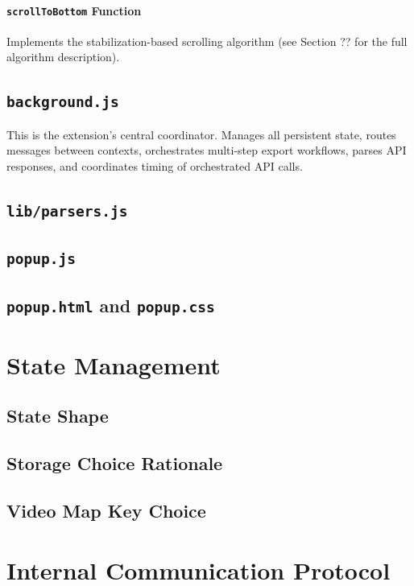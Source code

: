 \paragraph{\textbf{\texttt{scrollToBottom} Function}}

Implements the stabilization-based scrolling algorithm (see Section ?? for the full algorithm description).

\subsection{\texttt{background.js}}

This is the extension's central coordinator. Manages all persistent state, routes messages between contexts, orchestrates multi-step export workflows, parses API responses, and coordinates timing of orchestrated API calls.

\subsection{\texttt{lib/parsers.js}}

\subsection{\texttt{popup.js}}

\subsection{\texttt{popup.html} and \texttt{popup.css}}


\section{State Management}

\subsection{State Shape}

\subsection{Storage Choice Rationale}

\subsection{Video Map Key Choice}


\section{Internal Communication Protocol}


